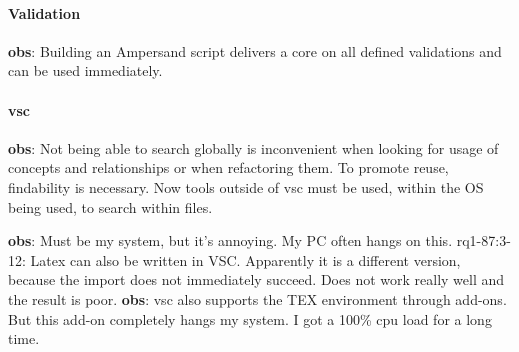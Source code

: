 \paragraph{Validation}
\begin{obs}\label{obs:rq1-57-1:7-11}
    \textbf{obs}: Building an Ampersand script delivers a core on all defined validations and can be used immediately.
\end{obs}

\paragraph{\acrlong{vsc}}
\begin{obs}\label{obs:rq1-22}
    \textbf{obs}: Not being able to search globally is inconvenient when looking for usage of concepts and relationships or when refactoring them.
    To promote reuse, findability is necessary.
    Now tools outside of \acrshort{vsc} must be used, within the OS being used, to search within files.
\end{obs}

\begin{obs}\label{obs:rq1-32:14-9}
    \textbf{obs}: Must be my system, but it's annoying.
    My PC often hangs on this.
     {rq1-87:3-12:} Latex can also be written in VSC.
    Apparently it is a different version, because the import does not immediately succeed.
    Does not work really well and the result is poor.
    \textbf{obs}: \acrlong{vsc} also supports the TEX environment through add-ons.
    But this add-on completely hangs my system.
    I got a 100\% cpu load for a long time. 
\end{obs}    

%
\newpage
